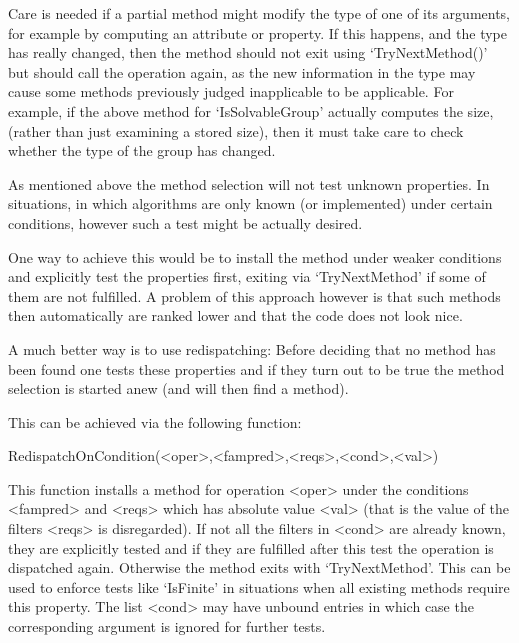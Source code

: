 Care is  needed  if a  partial  method  might  modify the  type of  one  of its
arguments, for example by computing an attribute  or property. If this happens,
and the type  has   really changed, then  the  method  should not  exit   using
`TryNextMethod()' but  should call the operation again,  as the new information
in the type may   cause  some methods  previously   judged inapplicable to   be
applicable. For  example, if  the  above method  for `IsSolvableGroup' actually
computes the size, (rather than  just examining  a  stored size), then it  must
take care to check whether the type of the group has changed.


As mentioned above the method selection will not test unknown properties.
In situations, in which algorithms are only known (or implemented) under
certain conditions, however such a test might be actually desired.

One way to achieve this would be to install the method under weaker
conditions and explicitly test the properties first, exiting via
`TryNextMethod' if some of them are not fulfilled.
A problem of this approach however is that such methods then automatically
are ranked lower and that the code does not look nice.

A much better way is to use redispatching: Before deciding that no method
has been found one tests these properties and if they turn out to be true
the method selection is started anew (and will then find a method).

This can be achieved via the following function:

\>RedispatchOnCondition(<oper>,<fampred>,<reqs>,<cond>,<val>)

This function installs a method for operation <oper> under the conditions
<fampred> and <reqs> which has absolute value <val> (that is the value of
the filters <reqs> is disregarded).  If not all the filters in <cond> are
already known, they are explicitly tested and if they are fulfilled after
this test the operation is dispatched again. Otherwise the method exits with
`TryNextMethod'. This can be used to enforce tests like `IsFinite' in
situations when all existing methods require this property.  The list <cond>
may have unbound entries in which case the corresponding argument is ignored
for further tests.




